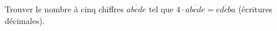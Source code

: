 Trouver le nombre à cinq chiffres $\overline{abcde}$ tel que $4 \cdot \overline{abcde} = \overline{edcba}$ (écritures décimales).
